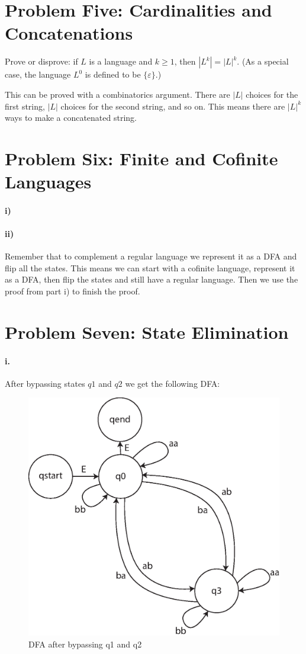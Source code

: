 \documentclass[10pt,letter]{article}
\begin{document}
\section*{Problem Five: Cardinalities and Concatenations}
Prove or disprove: if $L$ is a language and $k \ge 1$, then $|L^k| = |L|^k$. (As a special case, the language $L^0$ is defined to be $\{\varepsilon\}$.) 

This can be proved with a combinatorics argument. There are $|L|$ choices for the first string, $|L|$ choices for the second string, and so on. This means there are $|L|^k$ ways to make a concatenated string. 



\section*{Problem Six: Finite and Cofinite Languages}

\paragraph{i)} 

\paragraph{ii)} Remember that to complement a regular language we represent it as a DFA and flip all the states. This means we can start with a cofinite language, represent it as a DFA, then flip the states and still have a regular language. Then we use the proof from part i) to finish the proof.

\section*{Problem Seven: State Elimination}

\paragraph{i.} After bypassing states $q1$ and $q2$ we get the following DFA:\\

\begin{figure}[h]
\centering
  \includegraphics[width=0.45\linewidth]{7i.eps}
  \caption{DFA after bypassing q1 and q2}
  \label{fig:7i}
\end{figure}
\end{document}
